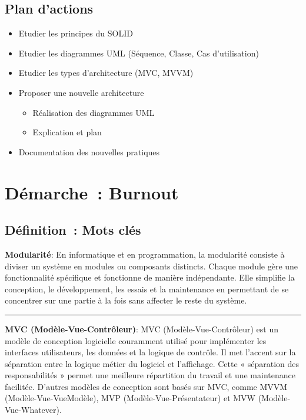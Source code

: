 \subsection*{Plan d'actions}
{}
\begin{itemize}
	\item Etudier les principes du SOLID
	\item Etudier les diagrammes UML (Séquence, Classe, Cas d'utilisation)
	\item Etudier les types d'architecture (MVC, MVVM)
	\item Proposer une nouvelle architecture
	\begin{itemize}
		\item Réalisation des diagrammes UML
		\item Explication et plan
	\end{itemize}
	\item Documentation des nouvelles pratiques
\end{itemize}

\newpage
\section*{Démarche~: Burnout}


\subsection*{Définition~: Mots clés}
{}

\noindent \textbf{Modularité}:
\noindent En informatique et en programmation, la modularité consiste à diviser un système en modules ou composants distincts. Chaque module gère une fonctionnalité spécifique et fonctionne de manière indépendante. Elle simplifie la conception, le développement, les essais et la maintenance en permettant de se concentrer sur une partie à la fois sans affecter le reste du système.

\begin{center}
\rule{5cm}{0.4pt}
\end{center}

\vspace{0.5cm}

\noindent \textbf{MVC (Modèle-Vue-Contrôleur)}:
\noindent MVC (Modèle-Vue-Contrôleur) est un modèle de conception logicielle couramment utilisé pour implémenter les interfaces utilisateurs, les données et la logique de contrôle. Il met l'accent sur la séparation entre la logique métier du logiciel et l'affichage. Cette « séparation des responsabilités » permet une meilleure répartition du travail et une maintenance facilitée. D'autres modèles de conception sont basés sur MVC, comme MVVM (Modèle-Vue-VueModèle), MVP (Modèle-Vue-Présentateur) et MVW (Modèle-Vue-Whatever).

